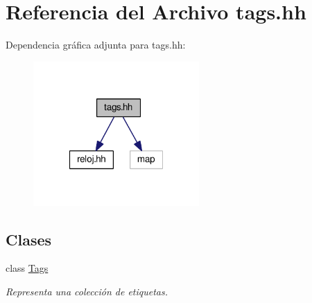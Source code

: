 \hypertarget{tags_8hh}{\section{Referencia del Archivo tags.\-hh}
\label{tags_8hh}
}
Dependencia gráfica adjunta para tags.\-hh\-:
\nopagebreak
\begin{figure}[H]
\begin{center}
\leavevmode
\includegraphics[width=179pt]{tags_8hh__incl}
\end{center}
\end{figure}
\subsection*{Clases}
\begin{DoxyCompactItemize}
\item 
class \hyperlink{class_tags}{Tags}
\begin{DoxyCompactList}\small\item\em Representa una colección de etiquetas. \end{DoxyCompactList}\end{DoxyCompactItemize}

